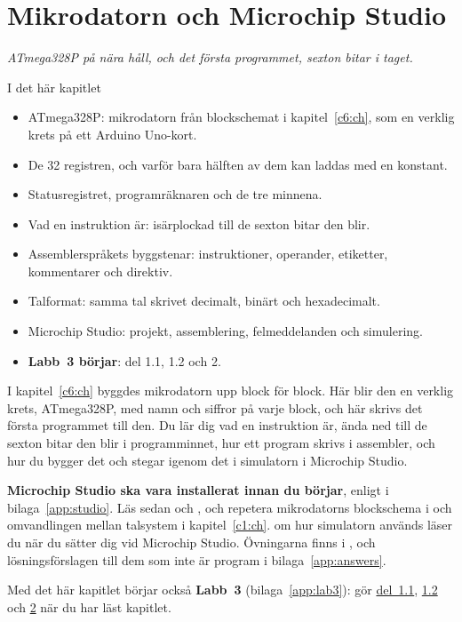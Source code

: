 
\chapter{Mikrodatorn och Microchip Studio}
\label{c7:ch}

{\large\itshape ATmega328P på nära håll, och det första programmet, sexton bitar i
taget.\par}

\begin{chapterbox}{I det här kapitlet}
\begin{itemize}
  \item ATmega328P: mikrodatorn från blockschemat i kapitel~\ref{c6:ch}, som en verklig krets på
    ett Arduino Uno-kort.
  \item De 32 registren, och varför bara hälften av dem kan laddas med en konstant.
  \item Statusregistret, programräknaren och de tre minnena.
  \item Vad en instruktion är:  isärplockad till de sexton bitar den blir.
  \item Assemblerspråkets byggstenar: instruktioner, operander, etiketter, kommentarer och
    direktiv.
  \item Talformat: samma tal skrivet decimalt, binärt och hexadecimalt.
  \item Microchip Studio: projekt, assemblering, felmeddelanden och simulering.
  \item \textbf{Labb~3 börjar}: del 1.1, 1.2 och 2.
\end{itemize}
\end{chapterbox}

I kapitel~\ref{c6:ch} byggdes mikrodatorn upp block för block. Här blir den en verklig krets,
ATmega328P, med namn och siffror på varje block, och här skrivs det första programmet till den. Du
lär dig vad en instruktion är, ända ned till de sexton bitar den blir i programminnet, hur ett
program skrivs i assembler, och hur du bygger det och stegar igenom det i simulatorn i Microchip
Studio.

\textbf{Microchip Studio ska vara installerat innan du börjar}, enligt  i
bilaga~\ref{app:studio}. Läs sedan  och , och repetera
mikrodatorns blockschema i  och omvandlingen mellan talsystem i
kapitel~\ref{c1:ch}.  om hur simulatorn används läser du när du sätter dig vid
Microchip Studio. Övningarna finns i , och lösningsförslagen till dem som
inte är program i bilaga~\ref{app:answers}.

Med det här kapitlet börjar också \textbf{Labb~3} (bilaga~\ref{app:lab3}): gör
\hyperref[lab3:d1-1]{del~1.1}, \hyperref[lab3:d1-2]{1.2} och \hyperref[lab3:d2]{2} när du har läst
kapitlet.






